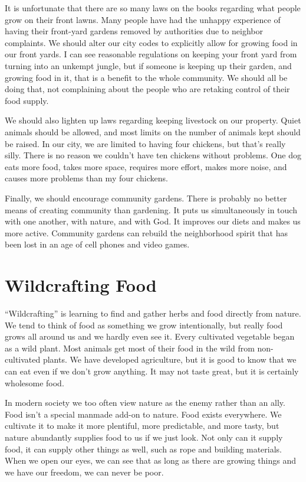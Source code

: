 \begin{policynote}
It is unfortunate that there are so many laws on the books regarding
what people grow on their front lawns. Many people have had the unhappy
experience of having their front-yard gardens removed by authorities
due to neighbor complaints. We should alter our city codes to
explicitly allow for growing food in our front yards. I can see
reasonable regulations on keeping your front yard from turning into an
unkempt jungle, but if someone is keeping up their garden, and growing
food in it, that is a benefit to the whole community. We should all be
doing that, not complaining about the people who are retaking control
of their food supply.

We should also lighten up laws regarding keeping livestock on our
property. Quiet animals should be allowed, and most limits on the
number of animals kept should be raised. In our city, we are limited to
having four chickens, but that’s really silly. There is no reason we
couldn’t have ten chickens without problems. One dog eats more food,
takes more space, requires more effort, makes more noise, and causes
more problems than my four chickens.

Finally, we should encourage community gardens. There is probably no
better means of creating community than gardening. It puts us
simultaneously in touch with one another, with nature, and with God. It
improves our diets and makes us more active. Community gardens can
rebuild the neighborhood spirit that has been lost in an age of cell
phones and video games.
\end{policynote}

\section{Wildcrafting Food}

“Wildcrafting” is learning to find and gather herbs and food directly
from nature. We tend to think of food as something we grow
intentionally, but really food grows all around us and we hardly even
see it. Every cultivated vegetable began as a wild plant. Most animals
get most of their food
in the wild from
non-cultivated plants. We have developed agriculture, but it is good to
know that we can eat even if we don’t grow anything. It may not taste
great, but it is certainly wholesome food.

In modern society we too often view nature as the enemy rather than an
ally. Food isn’t a special manmade add-on to nature. Food exists
everywhere. We cultivate it to make it more plentiful, more
predictable, and more tasty, but nature abundantly supplies food to us
if we just look. Not only can it supply food, it can supply other
things as
well, such as rope
and building materials. When we open our eyes, we can see that as long
as there are growing things and we have our freedom, we can never be
poor.

